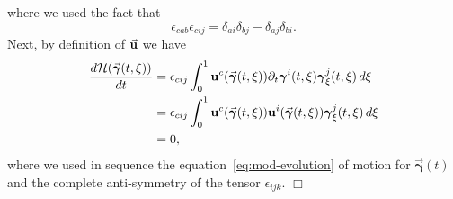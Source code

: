 \documentclass[a4paper,11pt]{article}
\numberwithin{equation}{section}
\newenvironment{proof}[1][Proof]{{\sc #1.} }{\hfill $\Box$}
\newcommand{\U}{\mbox{$\vec{\bf u}$}}
\newcommand{\UU}{\mbox{${\bf u}$}}
\newcommand{\bgamma}{\mbox{$\vec{\boldsymbol \gamma}$}}
\newcommand{\bbgamma}{\mbox{${\boldsymbol \gamma}$}}
\begin{document}
\begin{proof}
where we used the fact that 
$$
\epsilon_{cab}\epsilon_{cij}=\delta_{ai}\delta_{bj}-\delta_{aj}
\delta_{bi}. 
$$
Next, by definition of $\U$ we have
\begin{equation*}
  \begin{aligned}
\frac{d \mathcal{H}(\bgamma(t,\xi))}{dt} & = \epsilon_{cij} \int_0^1
\UU^c({\bgamma(t,\xi)}) {\partial_t\bbgamma^i(t,\xi)}
{\bbgamma_\xi^j(t,\xi)}\, d\xi\\ & = \epsilon_{cij} \int_0^1
\UU^c({\bgamma(t,\xi)})\UU^i({\bgamma(t,\xi)})
{\bbgamma_\xi^j(t,\xi)}\, d\xi\\ & = 0,
  \end{aligned}
\end{equation*}
where we used in sequence the equation~\eqref{eq:mod-evolution} of
motion for ${\bgamma(t)}$ and the complete anti-symmetry of the tensor
$\epsilon_{ijk}$.
\end{proof}
\end{document}
